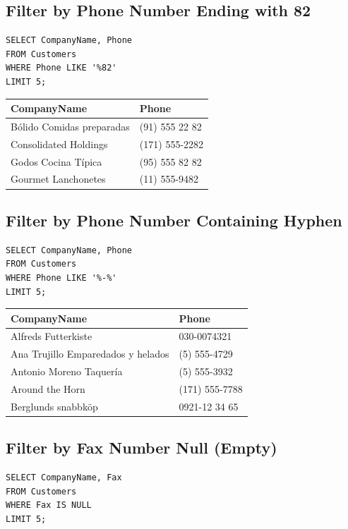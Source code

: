\documentclass[10pt]{article}
\begin{document}
\subsection{Filter by Phone Number Ending with 82}
\begin{verbatim}
SELECT CompanyName, Phone 
FROM Customers 
WHERE Phone LIKE '%82' 
LIMIT 5;
\end{verbatim}


\begin{table}[H]
\begin{tabular}{|l|l|}
\hline
CompanyName	& Phone \\
\hline
Bólido Comidas preparadas	& (91) 555 22 82 \\
Consolidated Holdings	& (171) 555-2282 \\
Godos Cocina Típica	& (95) 555 82 82 \\
Gourmet Lanchonetes	& (11) 555-9482 \\
\hline
\end{tabular}
\end{table}



\subsection{Filter by Phone Number Containing Hyphen}
\begin{verbatim}
SELECT CompanyName, Phone 
FROM Customers 
WHERE Phone LIKE '%-%' 
LIMIT 5;
\end{verbatim}

\begin{table}[H]
\begin{tabular}{|l|l|}
\hline
CompanyName	& Phone \\
\hline
Alfreds Futterkiste	& 030-0074321 \\
Ana Trujillo Emparedados y helados	& (5) 555-4729 \\
Antonio Moreno Taquería	& (5) 555-3932 \\
Around the Horn	& (171) 555-7788 \\
Berglunds snabbköp	& 0921-12 34 65 \\
\hline
\end{tabular}
\end{table}


\subsection{Filter by Fax Number Null (Empty)}
\begin{verbatim}
SELECT CompanyName, Fax 
FROM Customers 
WHERE Fax IS NULL
LIMIT 5;
\end{verbatim}
\end{document}

